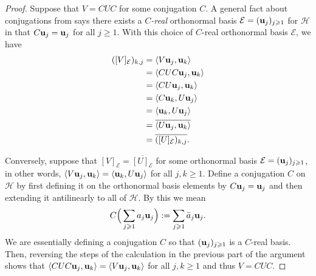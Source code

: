 \documentclass{dis}
\theoremstyle{plain}
\theoremstyle{definition}
\newtheorem{Remark}[equation]{Remark}
\renewcommand{\geq}{\geqslant}
\renewcommand{\vec}[1]{{\bf #1}}
\newcommand{\0}{{\color{lightgray}0}}
\begin{document}
\begin{proof}
Suppose that $V = C U C$ for some conjugation $C$. A  general fact about conjugations from \cite[Lemma 1]{MR2187654}  says  there exists a {\em $C$-real} orthonormal basis  $\mathcal{E} = (\vec{u}_j)_{j \geq 1}$ for $\mathcal{H}$ in that $C \vec{u}_j = \vec{u}_j$ for all $j \geq 1$. With this choice of $C$-real orthonormal basis $\mathcal{E}$, we have
\begin{align*}
([V]_{\mathcal{E}})_{k, j} & =  \langle V \vec{u}_j, \vec{u}_k\rangle\\
&= \langle C U C \vec{u}_j, \vec{u}_k\rangle\\
& = \langle C U \vec{u}_j, \vec{u}_k\rangle\\
& = \langle C \vec{u}_k, U \vec{u}_j\rangle\\
& = \langle \vec{u}_k, U \vec{u}_j\rangle\\
& = \overline{\langle U \vec{u}_j, \vec{u}_k\rangle}\\
& = \overline{([U]_{\mathcal{E}})_{k, j}}.
\end{align*}

Conversely, suppose that $[V]_{\mathcal{E}} = \overline{[U]_{\mathcal{E}}}$ for some orthonormal basis $\mathcal{E} = (\vec{u}_j)_{j \geq 1}$, in other words, $\langle V \vec{u}_j, \vec{u}_k\rangle = \langle \vec{u}_k, U \vec{u}_j\rangle$ for all $j, k \geq 1$. Define a conjugation $C$ on $\mathcal{H}$ by first defining it on the orthonormal basis elements by $C \vec{u}_j = \vec{u}_j$ and then extending it antilinearly to all of $\mathcal{H}$. By this we mean 
\begin{equation}\label{Creeeeeeel}
C\Big(\sum_{j \geq 1} a_j \vec{u}_j \Big) := \sum_{j \geq 1} \bar a_j \vec{u}_j.
\end{equation}
We are essentially defining a conjugation $C$ so that $(\vec{u}_j)_{j \geq 1}$ is a  $C$-real basis. Then, reversing the steps of  the calculation in the previous part of the argument shows that $\langle C U C \vec{u}_{j}, \vec{u}_k\rangle = \langle V  \vec{u}_{j}, \vec{u}_k\rangle$ for all $j, k \geq 1$ and thus  $V = C UC$.
\end{proof}


\end{document}
